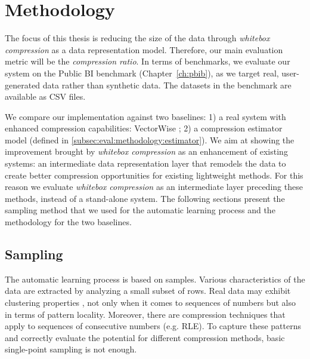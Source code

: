 \section{Methodology}
\label{sec:eval:methodology}



\graphicspath{{6_evaluation/images/}}

% 

The focus of this thesis is reducing the size of the data through \textit{whitebox compression} as a data representation model. Therefore, our main evaluation metric will be the \textit{compression ratio}. In terms of benchmarks, we evaluate our system on the Public BI benchmark (Chapter~\ref{ch:pbib}), as we target real, user-generated data rather than synthetic data. The datasets in the benchmark are available as CSV files.

We compare our implementation against two baselines: 1) a real system with enhanced compression capabilities: VectorWise \cite{zukowski2012vectorwise}; 2) a compression estimator model (defined in \ref{subsec:eval:methodology:estimator}). We aim at showing the improvement brought by \textit{whitebox compression} as an enhancement of existing systems: an intermediate data representation layer that remodels the data to create better compression opportunities for existing lightweight methods. For this reason we evaluate \textit{whitebox compression} as an intermediate layer preceding these methods, instead of a stand-alone system. The following sections present the sampling method that we used for the automatic learning process and the methodology for the two baselines.

\iffalse
good words: "prior to"
\fi



\subsection{Sampling}
\label{subsec:eval:methodology:sampling}

The automatic learning process is based on samples. Various characteristics of the data are extracted by analyzing a small subset of rows. Real data may exhibit clustering properties \cite{sidirourgos2013column}, not only when it comes to sequences of numbers but also in terms of pattern locality. Moreover, there are compression techniques that apply to sequences of consecutive numbers (e.g. RLE). To capture these patterns and correctly evaluate the potential for different compression methods, basic single-point sampling is not enough.

